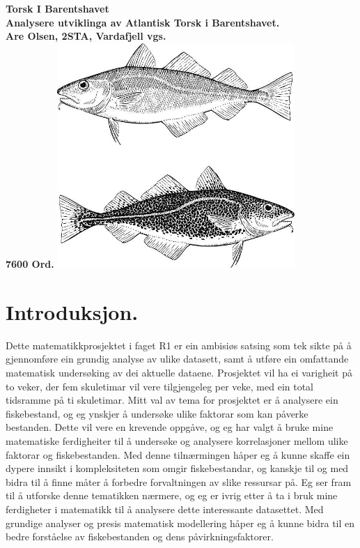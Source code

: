 \documentclass{report}
\begin{document}
\date{\today}
\begin{titlepage}
	\centering
	\vfill
	{\bfseries
		\Huge Torsk I Barentshavet\\ \Large
		Analysere utviklinga av Atlantisk Torsk i Barentshavet.\\
		\vskip2cm
		Are Olsen, 2STA, Vardafjell vgs.\\
		7600 Ord.
	}
	\vfill
	\includegraphics[width=9cm]{Bileter/Torsk.jpg} %
	\vfill
	\vfill
\end{titlepage}

\tableofcontents

\chapter{Introduksjon.}
Dette matematikkprosjektet i faget R1 er ein ambisiøs satsing som tek sikte på å gjennomføre ein grundig analyse av ulike datasett, samt å utføre ein omfattande matematisk undersøking av dei aktuelle dataene. Prosjektet vil ha ei varigheit på to veker, der fem skuletimar vil vere tilgjengeleg per veke, med ein total tidsramme på ti skuletimar.
Mitt val av tema for prosjektet er å analysere ein fiskebestand, og eg ynskjer å undersøke ulike faktorar som kan påverke bestanden. Dette vil vere en krevende oppgåve, og eg har valgt å bruke mine matematiske ferdigheiter til å undersøke og analysere korrelasjoner mellom ulike faktorar og fiskebestanden. Med denne tilnærmingen håper eg å kunne skaffe ein dypere innsikt i kompleksiteten som omgir fiskebestandar, og kanskje til og med bidra til å finne måter å forbedre forvaltningen av slike ressursar på.
Eg ser fram til å utforske denne tematikken nærmere, og eg er ivrig etter å ta i bruk mine ferdigheter i matematikk til å analysere dette interessante datasettet. Med grundige analyser og presis matematisk modellering håper eg å kunne bidra til en bedre forståelse av fiskebestanden og dens påvirkningsfaktorer.
\end{document}
